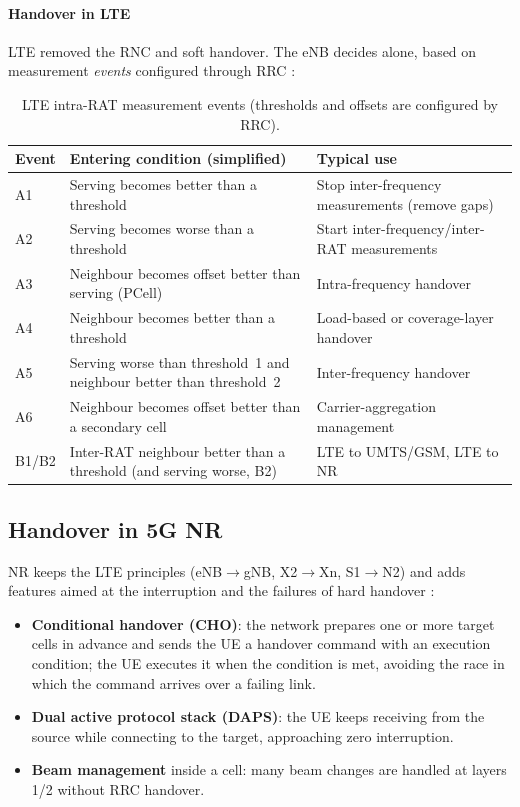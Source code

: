 \documentclass[11pt,a4paper]{article}
\begin{document}
\paragraph{Handover in LTE} LTE removed the RNC and soft handover. The eNB decides alone, based
on measurement \emph{events} configured through RRC \cite{ts36331}:
\begin{table}[htbp]
\centering\small
\caption{LTE intra-RAT measurement events (thresholds and offsets are configured by RRC).}\label{tab:events}
\begin{tabularx}{\linewidth}{@{}l Y Y@{}}
\toprule
{}Event & Entering condition (simplified) & Typical use \\
\midrule
A1 & Serving becomes better than a threshold & Stop inter-frequency measurements (remove gaps) \\
A2 & Serving becomes worse than a threshold & Start inter-frequency/inter-RAT measurements \\
A3 & Neighbour becomes offset better than serving (PCell) & Intra-frequency handover \\
A4 & Neighbour becomes better than a threshold & Load-based or coverage-layer handover \\
A5 & Serving worse than threshold~1 and neighbour better than threshold~2 & Inter-frequency handover \\
A6 & Neighbour becomes offset better than a secondary cell & Carrier-aggregation management \\
B1/B2 & Inter-RAT neighbour better than a threshold (and serving worse, B2) & LTE to UMTS/GSM, LTE to NR \\
\bottomrule
\end{tabularx}
\end{table}

\subsection{Handover in 5G NR}
NR keeps the LTE principles (eNB$\to$gNB, X2$\to$Xn, S1$\to$N2) and adds features aimed at the
interruption and the failures of hard handover \cite{ts38300}:
\begin{itemize}
  \item \textbf{Conditional handover (CHO)}: the network prepares one or more target cells in
        advance and sends the UE a handover command with an execution condition; the UE executes
        it when the condition is met, avoiding the race in which the command arrives over a
        failing link.
  \item \textbf{Dual active protocol stack (DAPS)}: the UE keeps receiving from the source while
        connecting to the target, approaching zero interruption.
  \item \textbf{Beam management} inside a cell: many beam changes are handled at layers 1/2
        without RRC handover.
\end{itemize}
\end{document}
